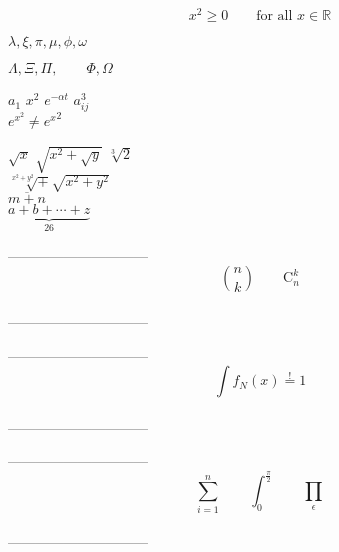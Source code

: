 \documentclass{article}
\begin{document}
  \begin{displaymath}
    x^2 \geq 0\qquad
    \textrm{for all }x\in\mathbb{R}
  \end{displaymath}
  \begin{center}
  $\lambda,\xi,\pi,\mu,\phi,\omega$
  
  $\Lambda,\Xi,\Pi,\qquad\Phi,\Omega$

  $a_{1}$ \qquad $x^{2}$ \qquad
  $e^{-\alpha t}$ \qquad
  $a^{3}_{ij}$\\
  $e^{x^2}\neq {e^x}^2$

  $\sqrt{x}$ \qquad
  $\sqrt{x^{2}+\sqrt{y}}$\qquad
  $\sqrt[3]{2}$ \\[3pt]
  $\surd[x^2 + y^2] + \sqrt{x^2+y^2}$\\
  $\overline{m+n}$\\
  $\underbrace{a+b+\cdots+z}_{26}$

  \end{center}
  \begin{center}
  ------------------------------\\
  \begin{displaymath}
    \binom{n}{k}\qquad\mathrm{C}_n^k
  \end{displaymath}
  \\
  ------------------------------
  \end{center}
  \begin{center}
  ------------------------------\\
  \begin{displaymath}
    \int f_N(x) \stackrel{!}{=} 1
  \end{displaymath}
  \\
  ------------------------------
  \end{center}
  \begin{center}
  ------------------------------\\
  \begin{displaymath}
    \sum_{i=1}^{n} \qquad
    \int_{0}^{\frac{\pi}{2}} \qquad
    \prod_\epsilon
  \end{displaymath}
  \\
  ------------------------------
  \end{center}
\end{document}
